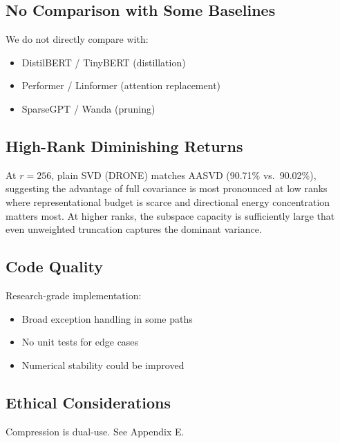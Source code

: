 \subsection{No Comparison with Some Baselines}

We do not directly compare with:
\begin{itemize}
\item DistilBERT / TinyBERT (distillation)
\item Performer / Linformer (attention replacement)
\item SparseGPT / Wanda (pruning)

\end{itemize}
\subsection{High-Rank Diminishing Returns}

At $r=256$, plain SVD (DRONE) matches AASVD (90.71\% vs.\ 90.02\%), suggesting the advantage of full covariance is most pronounced at low ranks where representational budget is scarce and directional energy concentration matters most. At higher ranks, the subspace capacity is sufficiently large that even unweighted truncation captures the dominant variance.

\subsection{Code Quality}

Research-grade implementation:
\begin{itemize}
\item Broad exception handling in some paths
\item No unit tests for edge cases
\item Numerical stability could be improved

\end{itemize}
\subsection{Ethical Considerations}

Compression is dual-use. See Appendix E.